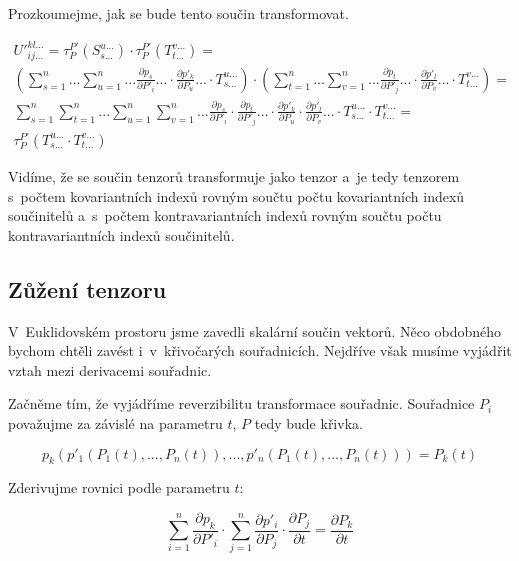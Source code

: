 Prozkoumejme, jak se bude tento součin transformovat.

\begin{equation}
\begin{split}
U'^{kl...}_{ij...} = \tau_{P}^{P'}(S_{s...}^{u...}) \cdot \tau_{P}^{P'}(T_{t...}^{v...}) = \\
\left( \sum_{s=1}^n ... \sum_{u=1}^n ... \frac{\partial p_s}{\partial P'_i} ... \cdot \frac{\partial p'_k}{\partial P_u} ... \cdot T_{s...}^{u...} \right) \cdot \left( \sum_{t=1}^n ... \sum_{v=1}^n ... \frac{\partial p_t}{\partial P'_j} ... \cdot \frac{\partial p'_l}{\partial P_v} ... \cdot T_{t...}^{v...} \right) = \\
\sum_{s=1}^n \sum_{t=1}^n ... \sum_{u=1}^n \sum_{v=1}^n ... \frac{\partial p_s}{\partial P'_i} \cdot \frac{\partial p_t}{\partial P'_j} ... \cdot \frac{\partial p'_k}{\partial P_u} \cdot \frac{\partial p'_l}{\partial P_v} ... \cdot T_{s...}^{u...} \cdot T_{t...}^{v...} = \\
\tau_{P}^{P'}(T_{s...}^{u...} \cdot T_{t...}^{v...})
\end{split}
\end{equation}

Vidíme, že se součin tenzorů transformuje jako tenzor a~je tedy tenzorem s~počtem kovariantních indexů rovným součtu počtu kovariantních indexů součinitelů a~s~počtem kontravariantních indexů rovným součtu počtu kontravariantních indexů součinitelů. 

\subsection{Zůžení tenzoru}

V~Euklidovském prostoru jsme zavedli skalární součin vektorů. Něco obdobného bychom chtěli zavést i~v~křivočarých souřadnicích. Nejdříve však musíme vyjádřit vztah mezi derivacemi souřadnic.

Začněme tím, že vyjádříme reverzibilitu transformace souřadnic. Souřadnice \(P_i\) považujme za závislé na parametru \(t\), \(P\) tedy bude křivka.

\begin{equation}
p_k(p'_1(P_1(t), ..., P_n(t)), ..., p'_n(P_1(t), ..., P_n(t))) = P_k(t)
\end{equation}

Zderivujme rovnici podle parametru \(t\):

\begin{equation}
\label{eq:reverzibilni_derivace}
\sum_{i=1}^n \frac{\partial p_k}{\partial P'_i} \cdot \sum_{j=1}^n \frac{\partial p'_i}{\partial P_j} \cdot \frac{\partial P_j}{\partial t} = \frac{\partial P_k}{\partial t}
\end{equation}

